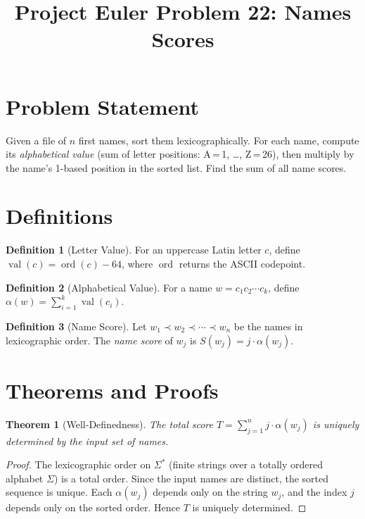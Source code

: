 \documentclass[12pt,a4paper]{article}
\title{Project Euler Problem 22: Names Scores}
\author{}
\date{}
\newtheorem{theorem}{Theorem}
\theoremstyle{definition}
\newtheorem{definition}{Definition}
\begin{document}
\maketitle

\section{Problem Statement}

Given a file of $n$ first names, sort them lexicographically. For each name, compute its \emph{alphabetical value} (sum of letter positions: A\,=\,1, \ldots, Z\,=\,26), then multiply by the name's 1-based position in the sorted list. Find the sum of all name scores.

\section{Definitions}

\begin{definition}[Letter Value]
For an uppercase Latin letter $c$, define $\operatorname{val}(c) = \operatorname{ord}(c) - 64$, where $\operatorname{ord}$ returns the ASCII codepoint.
\end{definition}

\begin{definition}[Alphabetical Value]
For a name $w = c_1 c_2 \cdots c_k$, define $\alpha(w) = \sum_{i=1}^{k} \operatorname{val}(c_i)$.
\end{definition}

\begin{definition}[Name Score]
Let $w_1 \prec w_2 \prec \cdots \prec w_n$ be the names in lexicographic order. The \emph{name score} of $w_j$ is $S(w_j) = j \cdot \alpha(w_j)$.
\end{definition}

\section{Theorems and Proofs}

\begin{theorem}[Well-Definedness]
The total score $T = \sum_{j=1}^{n} j \cdot \alpha(w_j)$ is uniquely determined by the input set of names.
\end{theorem}

\begin{proof}
The lexicographic order on $\Sigma^*$ (finite strings over a totally ordered alphabet $\Sigma$) is a total order. Since the input names are distinct, the sorted sequence is unique. Each $\alpha(w_j)$ depends only on the string $w_j$, and the index $j$ depends only on the sorted order. Hence $T$ is uniquely determined.
\end{proof}
\end{document}
